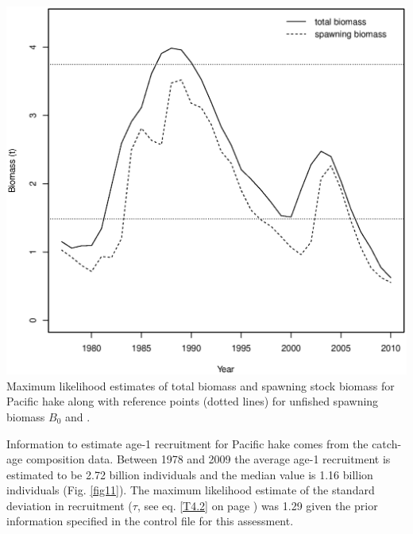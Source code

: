 \begin{multicols}{2}
\begin{figurehere}
	\centering
	\includegraphics[width=0.95\columnwidth]{iscamFigs/phakefig2.eps}\\
	\caption{Maximum likelihood estimates of total biomass and spawning stock biomass for Pacific hake along with reference points (dotted lines) for unfished spawning biomass $B_0$ and \bmsy.}\label{fig9}
\end{figurehere}

Information to estimate age-1 recruitment for Pacific hake comes from the catch-age composition data.  Between 1978 and 2009 the average age-1 recruitment is estimated to be 2.72 billion individuals and the median value is 1.16 billion individuals (Fig. \ref{fig11}).  The maximum likelihood estimate of the standard deviation in recruitment ($\tau$, see eq. \ref{T4.2} on page \pageref{Table4}) was 1.29 given the prior information specified in the control file for this assessment.


\end{multicols}
